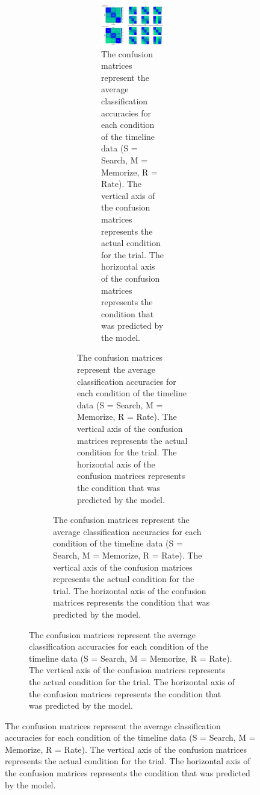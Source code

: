 \documentclass[
  english,
  man, donotrepeattitle,floatsintext]{apa6}
\begin{document}
\begin{figure}
\begin{figure}
\begin{figure}
\begin{figure}
\begin{figure}
\centering
\includegraphics{figures/timeline_conf_matrices.pdf}
\caption{\label{fig:timeline-conf-matrices}The confusion matrices represent the average classification accuracies for each condition of the timeline data (S = Search, M = Memorize, R = Rate). The vertical axis of the confusion matrices represents the actual condition for the trial. The horizontal axis of the confusion matrices represents the condition that was predicted by the model.}
\end{figure}


\end{figure}
\end{figure}
\end{figure}
\end{figure}
\end{document}
